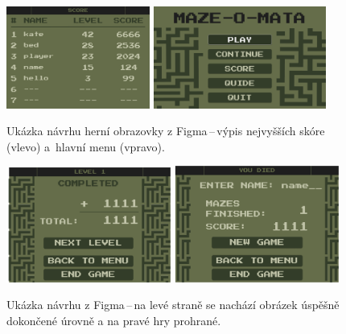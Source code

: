 \begin{figure}[H]
    \centering
    \includegraphics[width=0.42\textwidth]{obrazky-figures/ch3/Score_screen.png}\hspace{0.1cm}
    \includegraphics[width=0.505\textwidth]{obrazky-figures/ch1/game_menu.png}
    \caption{Ukázka návrhu herní obrazovky z Figma\,--\,výpis nejvyšších skóre (vlevo) a~hlavní menu (vpravo).}
    \label{fig:score_screen}
\end{figure}


\begin{figure}[H]
    \centering
    \includegraphics[width=0.482\textwidth]{obrazky-figures/ch3/level_completed_screen.png}\hspace{0.1cm}
    \includegraphics[width=0.48\textwidth]{obrazky-figures/ch3/end_game_screen.png}
    \caption{Ukázka návrhu z Figma\,--\,na levé straně se nachází obrázek úspěšně dokončené úrovně a na pravé hry prohrané.}
    \label{fig:end_level_game}
\end{figure}


